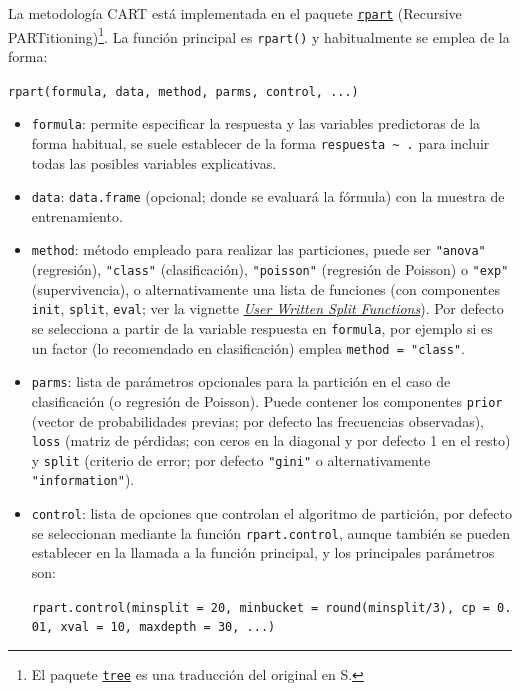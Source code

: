 \documentclass[]{book}
\theoremstyle{break}
\theoremstyle{definition}
\theoremstyle{definition}
\theoremstyle{definition}
\theoremstyle{remark}
\begin{document}
La metodología CART está implementada en el paquete
\href{https://CRAN.R-project.org/package=rpart}{\texttt{rpart}}
(Recursive PARTitioning)\footnote{El paquete
  \href{https://CRAN.R-project.org/package=tree}{\texttt{tree}} es una
  traducción del original en S.}. La función principal es
\texttt{rpart()} y habitualmente se emplea de la forma:

\texttt{rpart(formula,\ data,\ method,\ parms,\ control,\ ...)}

\begin{itemize}
\item
  \texttt{formula}: permite especificar la respuesta y las variables
  predictoras de la forma habitual, se suele establecer de la forma
  \texttt{respuesta\ \textasciitilde{}\ .} para incluir todas las
  posibles variables explicativas.
\item
  \texttt{data}: \texttt{data.frame} (opcional; donde se evaluará la
  fórmula) con la muestra de entrenamiento.
\item
  \texttt{method}: método empleado para realizar las particiones, puede
  ser \texttt{"anova"} (regresión), \texttt{"class"} (clasificación),
  \texttt{"poisson"} (regresión de Poisson) o \texttt{"exp"}
  (supervivencia), o alternativamente una lista de funciones (con
  componentes \texttt{init}, \texttt{split}, \texttt{eval}; ver la
  vignette
  \href{https://cran.r-project.org/web/packages/rpart/vignettes/usercode.pdf}{\emph{User
  Written Split Functions}}). Por defecto se selecciona a partir de la
  variable respuesta en \texttt{formula}, por ejemplo si es un factor
  (lo recomendado en clasificación) emplea \texttt{method\ =\ "class"}.
\item
  \texttt{parms}: lista de parámetros opcionales para la partición en el
  caso de clasificación (o regresión de Poisson). Puede contener los
  componentes \texttt{prior} (vector de probabilidades previas; por
  defecto las frecuencias observadas), \texttt{loss} (matriz de
  pérdidas; con ceros en la diagonal y por defecto 1 en el resto) y
  \texttt{split} (criterio de error; por defecto \texttt{"gini"} o
  alternativamente \texttt{"information"}).
\item
  \texttt{control}: lista de opciones que controlan el algoritmo de
  partición, por defecto se seleccionan mediante la función
  \texttt{rpart.control}, aunque también se pueden establecer en la
  llamada a la función principal, y los principales parámetros son:

  \texttt{rpart.control(minsplit\ =\ 20,\ minbucket\ =\ round(minsplit/3),\ cp\ =\ 0.01,\ xval\ =\ 10,\ maxdepth\ =\ 30,\ ...)}


\end{itemize}
\end{document}
